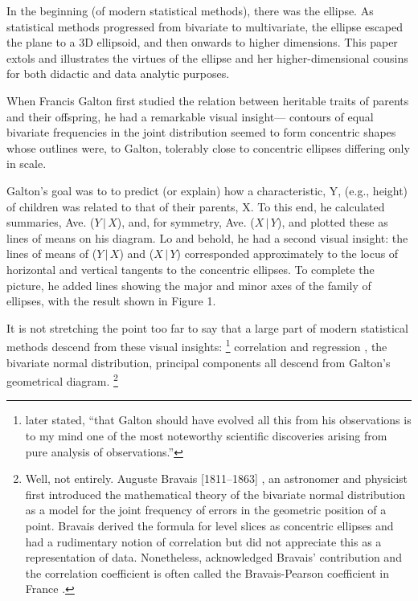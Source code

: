 \documentclass[11pt]{article}%
\newcommand*{\todo}[1]{\marginpar{ToDo:\small{#1}}}
\newcommand*{\given}{\ensuremath{\, | \,}}
\begin{document}
In the beginning (of modern  statistical methods), there was the  ellipse. As statistical
methods progressed from bivariate to multivariate, the ellipse escaped the plane to a 3D
ellipsoid, and then onwards to higher dimensions.
This  paper extols and illustrates the
virtues of the ellipse and her higher-dimensional cousins for both didactic and
data analytic purposes.

When
Francis Galton  \citeyearpar{Galton:1886} first  studied the  relation between  heritable traits of
parents and their offspring, he  had a remarkable visual insight---  contours of
equal bivariate frequencies in the joint distribution seemed to form  concentric
shapes whose outlines  were, to Galton,  tolerably close to  concentric ellipses
differing only in scale.  

Galton's goal was to  to predict (or explain)  how a characteristic, Y,   (e.g.,
height) of children was  related to that of  their parents, X.  To  this end, he
calculated summaries,  Ave. ($Y\given X$),  and, for  symmetry, Ave.  ($X\given Y$), and plotted
these as lines of means on his  diagram.  Lo and behold, he had a  second visual
insight:  the lines  of means of  ($Y\given X$) and ($X\given Y$)  corresponded approximately to
the locus of  horizontal and vertical  tangents to the  concentric ellipses.  To
complete the picture,  he added lines  showing the major  and minor axes  of the
family of ellipses, with the result shown in Figure 1.

It is  not stretching  the point  too far  to say  that a  large part  of modern
statistical  methods  descend  from  these  visual  insights:%
\footnote{\citet[p. 37]{Pearson:1920} later stated, ``that Galton
should have evolved all this from his observations is to my mind one
of the most noteworthy scientific discoveries arising from pure
analysis of observations.'' }
correlation   and
regression \citep{Pearson:1896}, the  bivariate normal  distribution,
principal components  \citep{Pearson:1901,Hotelling:1933}  all descend  from Galton's  geometrical
diagram.%
\footnote{
Well, not entirely. Auguste Bravais [1811--1863] \citeyearpar{Bravais:1846}, an astronomer
and physicist first introduced the mathematical theory of the bivariate normal distribution
as a model for the joint frequency of errors in the geometric position of a point.
Bravais derived the formula for level slices as concentric ellipses and had a rudimentary
notion of correlation but did not appreciate this as a representation of data.
Nonetheless, \cite{Pearson:1920} acknowledged Bravais' contribution and the correlation
coefficient is often called the Bravais-Pearson coefficient in France
\citep{Denis:2001}. }
\end{document}
